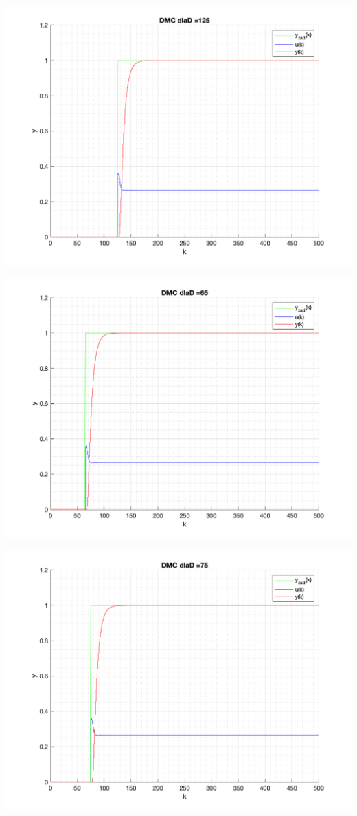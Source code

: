 \documentclass[a4paper, 11pt]{article}
\begin{document}
\begin{enumerate}
 \includegraphics[width=\linewidth]{./ModelsP4_D/P4_DMC_D_125_png.png} 
 
 \includegraphics[width=\linewidth]{./ModelsP4_D/P4_DMC_D_65_png.png} 
 
 \includegraphics[width=\linewidth]{./ModelsP4_D/P4_DMC_D_75_png.png} 
 

\end{enumerate}
\end{document}
